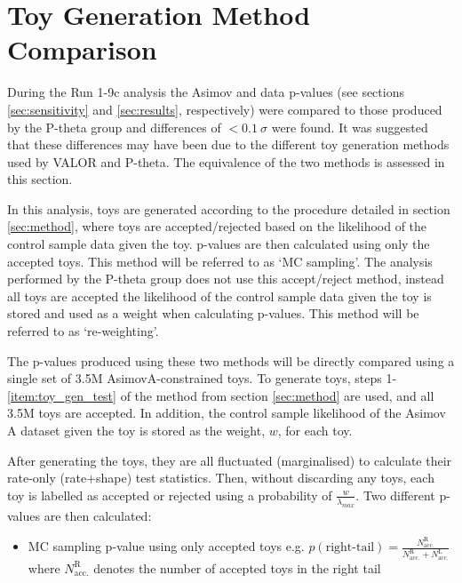 \FloatBarrier

{\color{red} 

\section{Toy Generation Method Comparison}\label{app:sampling_vs_reweighting}
During the Run 1-9c analysis the Asimov and data p-values (see sections \ref{sec:sensitivity} and \ref{sec:results}, respectively) were compared to those produced by the P-theta group and differences of $<\SI{0.1}{\sigma}$ were found. It was suggested that these differences may have been due to the different toy generation methods used by VALOR and P-theta. The equivalence of the two methods is assessed in this section.

In this analysis, toys are generated according to the procedure detailed in section \ref{sec:method}, where toys are accepted/rejected based on the likelihood of the control sample data given the toy. p-values are then calculated using only the accepted toys. This method will be referred to as `MC sampling'. The analysis performed by the P-theta group does not use this accept/reject method, instead all toys are accepted the likelihood of the control sample data given the toy is stored and used as a weight when calculating p-values. This method will be referred to as `re-weighting'.

The p-values produced using these two methods will be directly compared using a single set of 3.5M AsimovA-constrained toys. To generate toys, steps 1-\ref{item:toy_gen_test} of the method from section \ref{sec:method} are used, and all 3.5M toys are accepted. In addition, the control sample likelihood of the Asimov A dataset given the toy is stored as the weight, $w$, for each toy. 

After generating the toys, they are all fluctuated (marginalised) to calculate their rate-only (rate+shape) test statistics. Then, without discarding any toys, each toy is labelled as accepted or rejected using a probability of $\frac{w}{\lambda_{max}}$. Two different p-values are then calculated:
\begin{itemize}
	\item MC sampling p-value using only accepted toys e.g. 
	$p(\text{right-tail}) = 
	\frac{ N^{\text{R}}_{\text{acc.}} } 
	{ N^{\text{R}}_{\text{acc.}} + N^{\text{L}}_{\text{acc.}} }$\\
	where $N^{\text{R}}_{\text{acc.}}$ denotes the number of accepted toys in the right tail
	

\end{itemize}}
